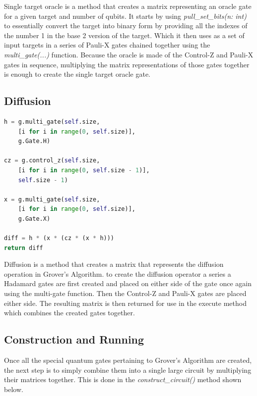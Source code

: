 \documentclass{article}
\begin{document}
Single target oracle is a method that creates a matrix representing an oracle gate for a given target and number of qubits. It starts by using \textit{pull\_set\_bits(n: int)} to essentially convert the target into binary form by providing all the indexes of the number 1 in the base 2 version of the target. Which it then uses as a set of input targets in a series of Pauli-X gates chained together using the \textit{multi\_gate(...)} function. Because the oracle is made of the Control-Z and Pauli-X gates in sequence, multiplying the matrix representations of those gates together is enough to create the single target oracle gate.

\subsection{Diffusion}

\begin{file}
\begin{lstlisting}[language=Python]
h = g.multi_gate(self.size, 
	[i for i in range(0, self.size)], 
	g.Gate.H)
			
cz = g.control_z(self.size, 
	[i for i in range(0, self.size - 1)], 
	self.size - 1)
			
x = g.multi_gate(self.size, 
	[i for i in range(0, self.size)], 
	g.Gate.X)
			
diff = h * (x * (cz * (x * h)))
return diff

\end{lstlisting}
\end{file}


Diffusion is a method that creates a matrix that represents the diffusion operation in Grover's Algorithm. to create the diffusion operator a series a Hadamard gates are first created and placed on either side of the gate once again using the multi-gate function. Then the Control-Z and Pauli-X gates are placed either side. The resulting matrix is then returned for use in the execute method which combines the created gates together.




\subsection{Construction and Running}

Once all the special quantum gates pertaining to Grover's Algorithm are created, the next step is to simply combine them into a single large circuit by multiplying their matrices together. This is done in the \textit{construct\_circuit()} method shown below.
\end{document}
